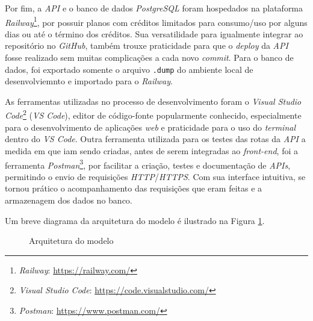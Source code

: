 \documentclass[english,brazilian]{UNISINOSartigo} %
\begin{document}
Por fim, a \textit{API} e o banco de dados \textit{PostgreSQL} foram hospedados na plataforma \textit{Railway}\footnote{\textit{Railway}: \url{https://railway.com/}}, por possuir planos com créditos limitados para consumo/uso por alguns dias ou até o término dos créditos. Sua versatilidade para igualmente integrar ao repositório no \textit{GitHub}, também trouxe praticidade para que o \textit{deploy} da \textit{API} fosse realizado sem muitas complicações a cada novo \textit{commit}. Para o banco de dados, foi exportado somente o arquivo \texttt{.dump} do ambiente local de desenvolviemnto e importado para o \textit{Railway}.

As ferramentas utilizadas no processo de desenvolvimento foram o \textit{Visual Studio Code}\footnote{\textit{Visual Studio Code}: \url{https://code.visualstudio.com/}} (\textit{VS Code}), editor de código-fonte popularmente conhecido, especialmente para o desenvolvimento de aplicações \textit{web} e praticidade para o uso do \textit{terminal} dentro do \textit{VS Code}. Outra ferramenta utilizada para os testes das rotas da \textit{API} a medida em que iam sendo criadas, antes de serem integradas ao \textit{front-end}, foi a ferramenta \textit{Postman}\footnote{\textit{Postman}: \url{https://www.postman.com/}}, por facilitar a criação, testes e documentação de \textit{APIs}, permitindo o envio de requisições \textit{HTTP}/\textit{HTTPS}. Com sua interface intuitiva, se tornou prático o acompanhamento das requisições que eram feitas e a armazenagem dos dados no banco.

Um breve diagrama da arquitetura do modelo é ilustrado na Figura \ref{fig:arquitetura}.

\begin{figure}[ht]
    \caption{Arquitetura do modelo}
    \label{fig:arquitetura}
    \centering
    \footnotesize
    \begin{minipage}{.9\textwidth}
        \centering
    \end{minipage}
\end{figure}
\FloatBarrier
\end{document}
